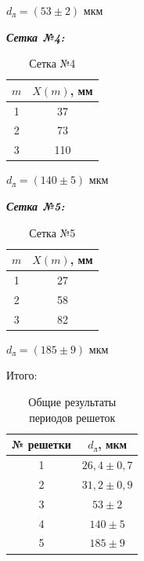 \documentclass[a4paper,12pt]{article} %
\begin{document}
	\begin{center}
		$\boxed{d_{\text{л}} = (53 \pm 2) \text{ мкм}}$
	\end{center}

	\newpage
	\textbf{{\large\textit{Сетка №4:}}}
	\begin{table}[h!]
		\centering
		\begin{tabular}{|c|c|}
			\hline
			$m$ & $X(m)$, мм \\ \hline
			1   & 37         \\ \hline
			2   & 73         \\ \hline
			3   & 110        \\ \hline
		\end{tabular}
		\caption{Сетка №4}
	\end{table}
	
	\begin{center}
		$\boxed{d_{\text{л}} = (140 \pm 5) \text{ мкм}}$
	\end{center}

	\textbf{{\large\textit{Сетка №5:}}}
	\begin{table}[h!]
		\centering
		\begin{tabular}{|c|c|}
			\hline
			$m$ & $X(m)$, мм \\ \hline
			1   & 27         \\ \hline
			2   & 58         \\ \hline
			3   & 82        \\ \hline
		\end{tabular}
		\caption{Сетка №5}
	\end{table}
	
	\begin{center}
		$\boxed{d_{\text{л}} = (185 \pm 9) \text{ мкм}}$
	\end{center}


	Итого:
	
	\begin{table}[h!]
		\centering
		\begin{tabular}{|c|c|}
			\hline
			№ решетки & $d_{\text{л}}$, мкм     \\ \hline
			1         & $26,4 \pm 0,7$ \\ \hline
			2         & $31,2 \pm 0,9$ \\ \hline
			3         & $53 \pm 2$     \\ \hline
			4         & $140 \pm 5$    \\ \hline
			5         & $185 \pm 9$    \\ \hline
		\end{tabular}
		\caption{Общие результаты периодов решеток}
	\end{table}
\end{document}
